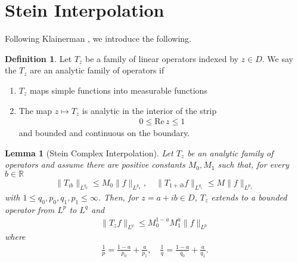 \documentclass[12pt,reqno]{amsart}
\numberwithin{equation}{section}  %
\numberwithin{figure}{section}
\newcommand{\rr}{\mathbb{R}}
\theoremstyle{plain}
\newtheorem{lemma}{Lemma}
\theoremstyle{definition}
\newtheorem{definition}{Definition}
\theoremstyle{remark}
\begin{document}
\section{Stein Interpolation} 
\label{sec:stein-interp}
Following Klainerman \cite{Klainerman:fk}, we introduce the following.  
\begin{definition}
Let $T_{z}$ be a family of linear operators indexed by $z \in D$. We say the
$T_{z}$ are an analytic family of operators if
\begin{enumerate}
\item{$T_{z}$ maps simple functions into measurable functions}
\item{The map $z \mapsto T_{z}$ is analytic in the interior of the strip
%
%
\begin{equation*}
\begin{split}
0 \le \text{Re}\, z \le 1
\end{split}
\end{equation*}
%
%
and bounded and continuous on the boundary.}
\end{enumerate}
\end{definition}
%
%
%
%
%
%
%
%
\begin{lemma}[Stein Complex Interpolation]
Let $T_{z}$ be an analytic family of operators and assume there are positive
constants $M_{0}, M_{1}$ such that, for every $b \in \rr$
%
%
\begin{equation*}
\begin{split}
\| T_{ib} \|_{L^{q_{0}}} \le M_{0} \| f \|_{L^{p_{0}}}, \quad \|
T_{1 + ib} f \|_{L^{q_{1}}} \le M \| f \|_{L^{p_{1}}}
\end{split}
\end{equation*}
%
%
with $1 \le q_{0}, p_{0}, q_{1}, p_{1} \le \infty$. Then, for $z = a + ib \in
D$, $T_{z}$ extends to a bounded operator from $L^{p}$ to $L^{q}$ and
%
%
\begin{equation*}
\begin{split}
\| T_{z} f \|_{L^{q}} \le M_{0}^{1-a} M_{1}^{a} \| f \|_{L^{p}}
\end{split}
\end{equation*}
%
%
where
%
%
\begin{equation*}
\begin{split}
\frac{1}{p} = \frac{1-a}{p_{0}} + \frac{a}{p_{1}}, \quad \frac{1}{q} =
\frac{1-a}{q_{0}} + \frac{a}{q_{1}}.
\end{split}
\end{equation*}
%
%
\label{lem:stein}
\end{lemma}
\end{document}
